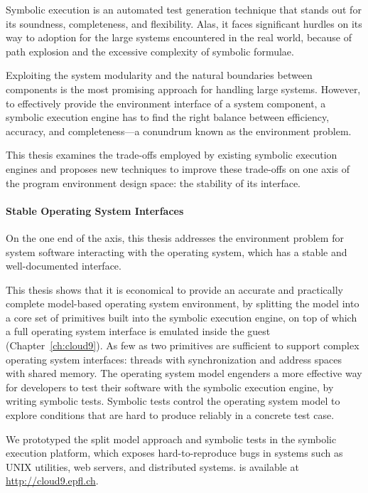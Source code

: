 Symbolic execution is an automated test generation technique that stands out for its soundness, completeness, and flexibility.
%
Alas, it faces significant hurdles on its way to adoption for the large systems encountered in the real world, because of path explosion and the excessive complexity of symbolic formulae.


Exploiting the system modularity and the natural boundaries between components is the most promising approach for handling large systems.
%
However, to effectively provide the environment interface of a system component, a symbolic execution engine has to find the right balance between efficiency, accuracy, and completeness---a conundrum known as the environment problem.


This thesis examines the trade-offs employed by existing symbolic execution engines and proposes new techniques to improve these trade-offs on one axis of the program environment design space: the stability of its interface.


\paragraph{Stable Operating System Interfaces}

On the one end of the axis, this thesis addresses the environment problem for system software interacting with the operating system, which has a stable and well-documented interface.

This thesis shows that it is economical to provide an accurate and practically complete model-based operating system environment, by splitting the model into a core set of primitives built into the symbolic execution engine, on top of which a full operating system interface is emulated inside the guest (Chapter~\ref{ch:cloud9}).
%
As few as two primitives are sufficient to support complex operating system interfaces: threads  with synchronization and address spaces with shared memory.
%
The operating system model engenders a more effective way for developers to test their software with the symbolic execution engine, by writing symbolic tests.  Symbolic tests control the operating system model to explore conditions that are hard to produce reliably in a concrete test case.

We prototyped the split model approach and symbolic tests in the \cnine symbolic execution platform, which exposes hard-to-reproduce bugs in systems such as UNIX utilities, web servers, and distributed systems.
%
\cnine is available at {\url{http://cloud9.epfl.ch}}.


